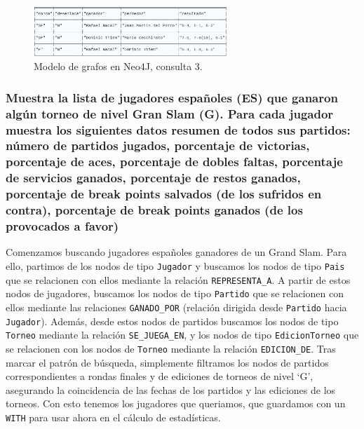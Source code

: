 \begin{figure}[H]
\centering
\includegraphics[width=0.65\textwidth]{fotos/q3_neo.png}
\caption{Modelo de grafos en Neo4J, consulta 3.}
\label{fig:q3_neo}
\end{figure}





\subsubsection{Muestra la lista de jugadores españoles (ES) que ganaron algún torneo de nivel Gran Slam (G). Para cada jugador muestra los siguientes datos resumen de todos sus partidos: número de partidos jugados, porcentaje de victorias, porcentaje de aces, porcentaje de dobles faltas, porcentaje de servicios ganados, porcentaje de restos ganados, porcentaje de break points salvados (de los sufridos en contra), porcentaje de break points ganados (de los provocados a favor)}

Comenzamos buscando jugadores españoles ganadores de un Grand Slam. Para ello, partimos de los nodos de tipo \texttt{Jugador} y buscamos los nodos de tipo \texttt{Pais} que se relacionen con ellos mediante la relación \texttt{REPRESENTA\_A}. A partir de estos nodos de jugadores, buscamos los nodos de tipo \texttt{Partido} que se relacionen con ellos mediante las relaciones \texttt{GANADO\_POR} (relación dirigida desde \texttt{Partido} hacia \texttt{Jugador}). Además, desde estos nodos de partidos buscamos los nodos de tipo \texttt{Torneo} mediante la relación \texttt{SE\_JUEGA\_EN}, y los nodos de tipo \texttt{EdicionTorneo} que se relacionen con los nodos de \texttt{Torneo} mediante la relación \texttt{EDICION\_DE}. Tras marcar el patrón de búsqueda, simplemente filtramos los nodos de partidos correspondientes a rondas finales y de ediciones de torneos de nivel `G', asegurando la coincidencia de las fechas de los partidos y las ediciones de los torneos. Con esto tenemos los jugadores que queriamos, que guardamos con un \texttt{WITH} para usar ahora en el cálculo de estadísticas. \\

